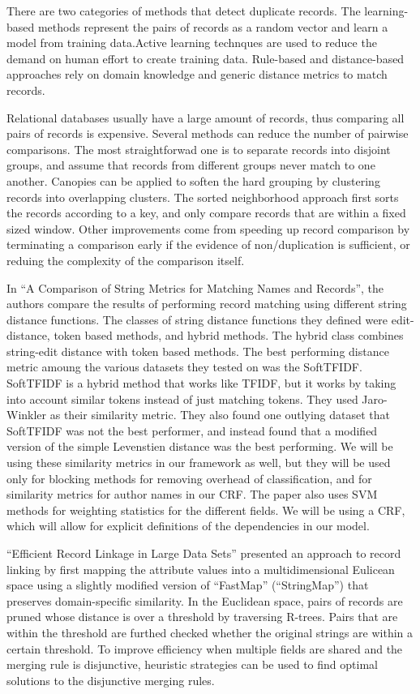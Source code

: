 \documentclass[]{article}
\begin{document}
There are two categories of methods that detect duplicate records.
The learning-based methods represent the pairs of records as a random vector and learn a model from training data.Active learning technques are used to reduce the demand on human effort to create training data.  Rule-based and distance-based approaches rely on domain knowledge and generic distance metrics to match records.

Relational databases usually have a large amount of records, thus comparing all pairs of records is expensive.  Several methods can reduce the number of pairwise comparisons.  The most straightforwad one is to separate records into disjoint groups, and assume that records from different groups never match to one another.  Canopies can be applied to soften the hard grouping by clustering records into overlapping clusters.  The sorted neighborhood approach first sorts the records according to a key, and only compare records that are within a fixed sized window.  Other improvements come from speeding up record comparison by terminating a comparison early if the evidence of non/duplication is sufficient, or reduing the complexity of the comparison itself.

In ``A Comparison of String Metrics for Matching Names and Records'', the authors compare the results of performing record matching using different string distance functions. The classes of string distance functions they defined were edit-distance, token based methods, and hybrid methods. The hybrid class combines string-edit distance with token based methods. The best performing distance metric amoung the various datasets they tested on was the SoftTFIDF. SoftTFIDF is a hybrid method that works like TFIDF, but it works by taking into account similar tokens instead of just matching tokens. They used Jaro-Winkler as their similarity metric. They also found one outlying dataset that SoftTFIDF was not the best performer, and instead found that a modified version of the simple Levenstien distance was the best performing. We will be using these similarity metrics in our framework as well, but they will be used only for blocking methods for removing overhead of classification, and for similarity metrics for author names in our CRF. The paper also uses SVM methods for weighting statistics for the different fields. We will be using a CRF, which will allow for explicit definitions of the dependencies in our model.

``Efficient Record Linkage in Large Data Sets'' presented an approach to record linking by first mapping the attribute values into a multidimensional Eulicean space using a slightly modified version of ``FastMap'' (``StringMap'') that preserves domain-specific similarity.  In the Euclidean space, pairs of records are pruned whose distance is over a threshold by traversing R-trees.  Pairs that are within the threshold are furthed checked whether the original strings are within a certain threshold.  To improve efficiency when multiple fields are shared and the merging rule is disjunctive, heuristic strategies can be used to find optimal solutions to the disjunctive merging rules.
\end{document}
